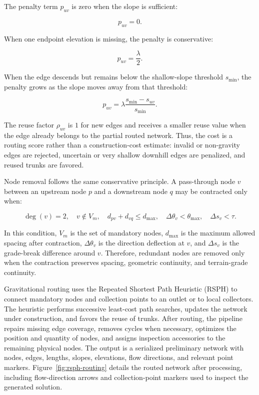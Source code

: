 The penalty term $p_{uv}$ is zero when the slope is sufficient:

\begin{equation}
p_{uv}=0.
\end{equation}

When one endpoint elevation is missing, the penalty is conservative:

\begin{equation}
p_{uv}=\frac{\lambda}{2}.
\end{equation}

When the edge descends but remains below the shallow-slope threshold $s_{\min}$, the penalty grows as the slope moves away from that threshold:

\begin{equation}
p_{uv}=\lambda\frac{s_{\min}-s_{uv}}{s_{\min}}.
\end{equation}

The reuse factor $\rho_{uv}$ is $1$ for new edges and receives a smaller reuse value when the edge already belongs to the partial routed network.
Thus, the cost is a routing score rather than a construction-cost estimate: invalid or non-gravity edges are rejected, uncertain or very shallow downhill edges are penalized, and reused trunks are favored.

Node removal follows the same conservative principle.
A pass-through node $v$ between an upstream node $p$ and a downstream node $q$ may be contracted only when:

\begin{equation}
\deg(v)=2,\quad v \notin V_m,\quad d_{pv}+d_{vq} \le d_{\max},\quad
\Delta\theta_v < \theta_{\max},\quad \Delta s_v < \tau.
\label{eq:node-contraction}
\end{equation}

In this condition, $V_m$ is the set of mandatory nodes, $d_{\max}$ is the maximum allowed spacing after contraction, $\Delta\theta_v$ is the direction deflection at $v$, and $\Delta s_v$ is the grade-break difference around $v$.
Therefore, redundant nodes are removed only when the contraction preserves spacing, geometric continuity, and terrain-grade continuity.

Gravitational routing uses the Repeated Shortest Path Heuristic (RSPH) to connect mandatory nodes and collection points to an outlet or to local collectors.
The heuristic performs successive least-cost path searches, updates the network under construction, and favors the reuse of trunks.
After routing, the pipeline repairs missing edge coverage, removes cycles when necessary, optimizes the position and quantity of nodes, and assigns inspection accessories to the remaining physical nodes.
The output is a serialized preliminary network with nodes, edges, lengths, slopes, elevations, flow directions, and relevant point markers.
Figure~\ref{fig:rsph-routing} details the routed network after processing, including flow-direction arrows and collection-point markers used to inspect the generated solution.


